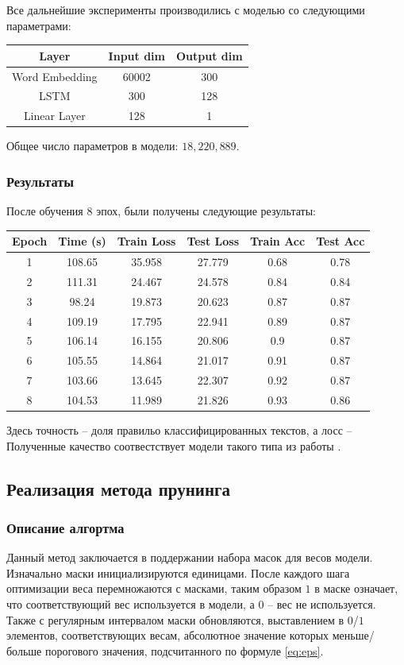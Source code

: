 \documentclass[12pt]{article}
\begin{document}
Все дальнейшие эксперименты производились с моделью со следующими параметрами:
\begin{center}
  \begin{tabular}{ c  c  c }
    \hline
    Layer & Input dim & Output dim \\ \hline
    Word Embedding & 60002 & 300 \\
    LSTM & 300 & 128 \\
    Linear Layer & 128 & 1 \\ \hline
  \end{tabular}
\end{center}

Общее число параметров в модели: $18,220,889$.
\subsubsection*{Результаты}
После обучения $8$ эпох, были получены следующие результаты:

\begin{center}
\begin{tabular}{cccccc}
  \hline
  Epoch & Time (s) & Train Loss & Test Loss & Train Acc & Test Acc \\ \hline
  1 & 108.65 & 35.958 & 27.779 & 0.68 & 0.78 \\
  2 & 111.31 & 24.467 & 24.578 & 0.84 & 0.84 \\
  3 & 98.24 & 19.873 & 20.623 & 0.87 & 0.87 \\
  4 & 109.19 & 17.795 & 22.941 & 0.89 & 0.87 \\
  5 & 106.14 & 16.155 & 20.806 & 0.9 & 0.87 \\
  6 & 105.55 & 14.864 & 21.017 & 0.91 & 0.87 \\
  7 & 103.66 & 13.645 & 22.307 & 0.92 & 0.87 \\
  8 & 104.53 & 11.989 & 21.826 & 0.93 & 0.86 \\ \hline
\end{tabular}
\end{center}

Здесь точность -- доля правильо классифицированных текстов, а лосс --  Полученные качество соотвестствует модели такого типа из работы \cite{stanfordrep}.


\subsection*{Реализация метода прунинга}
%
\subsubsection*{Описание алгортма}
Данный метод заключается в поддержании набора масок для весов модели. Изначально 
маски инициализируются единицами. После каждого шага оптимизации веса перемножаются 
с масками, таким образом $1$ в маске означает, что соответствующий вес используется в модели, а $0$ -- вес не используется. Также с регулярным интервалом маски обновляются, выставлением в $0$/$1$ элементов,
соответствующих весам, абсолютное значение которых меньше/больше порогового значения, подсчитанного 
по формуле \ref{eq:eps}.
\end{document}

